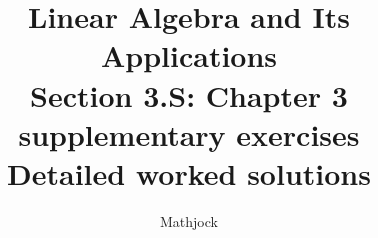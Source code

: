 
\title{\textbf{Linear Algebra and Its Applications}\\[0.3em]Section 3.S: Chapter 3 supplementary exercises\\[0.3em]\large Detailed worked solutions}
\author{Mathjock}
\date{}

\maketitle
\bookinfo
\tableofcontents
\clearpage
\renewcommand{\thesection}{3.S}
\renewcommand{\theHsection}{3.S}
\setcounter{section}{0}


